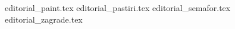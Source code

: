 \documentclass[a4paper]{article}
\date{July 17th 2020.}
\begin{document}
{editorial_paint.tex}
\clearpage
{editorial_pastiri.tex}
\clearpage
{editorial_semafor.tex}
\clearpage
{editorial_zagrade.tex}
\clearpage
\end{document}
